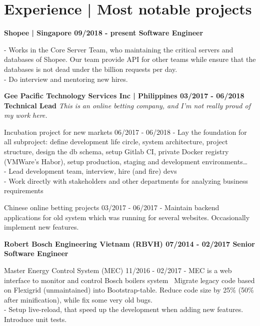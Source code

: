 \section*{Experience | \small{Most notable projects}}
{%
    \textbf{\event
      {Shopee | Singapore}
      {09/2018 - present}
      {Software Engineer}
    }

  {
    - Works in the Core Server Team, who maintaining the critical servers and
      databases of Shopee. Our team provide API for other teams while ensure
      that the databases is not dead under the billion requests per day.
      \\
    - Do interview and mentoring new hires.
  }
  \break

  \textbf{\event
    {Gee Pacific Technology Services Inc | Philippines}
    {03/2017 - 06/2018}
    {Technical Lead}
  }
  \textit{This is an online betting company, and I'm not really proud of my work
    here.}

  \event
  {Incubation project for new markets}
  {06/2017 - 06/2018}
  {
    - Lay the foundation for all subproject: define development life circle,
      system architecture, project structure, design the db schema, setup Gitlab
      CI, private Docker registry (VMWare's Habor), setup production, staging and
      development environments\dots
      \\
    - Lead development team, interview, hire (and fire) devs
      \\
    - Work directly with stakeholders and other departments for analyzing
      business requirements
  }

  \event
  {Chinese online betting projects}
  {03/2017 - 06/2017}
  {
    - Maintain backend applications for old system which was running for several
      websites. Occasionally implement new features.
  }

  \textbf{\event
    {Robert Bosch Engineering Vietnam (RBVH)}
    {07/2014 - 02/2017}
    {Senior Software Engineer}
  }

  \event
  {Master Energy Control System (MEC)}
  {11/2016 - 02/2017}
  {
    - MEC is a web interface to monitor and control Bosch boilers system
      \
       Migrate legacy code based on Flexigrid (unmaintained) into Bootstrap-table.
      Reduce code size by 25\% (50\% after minification), while fix some very old
      bugs.\\
      - Setup live-reload, that speed up the development when adding new
      features. Introduce unit tests.
  }

}
